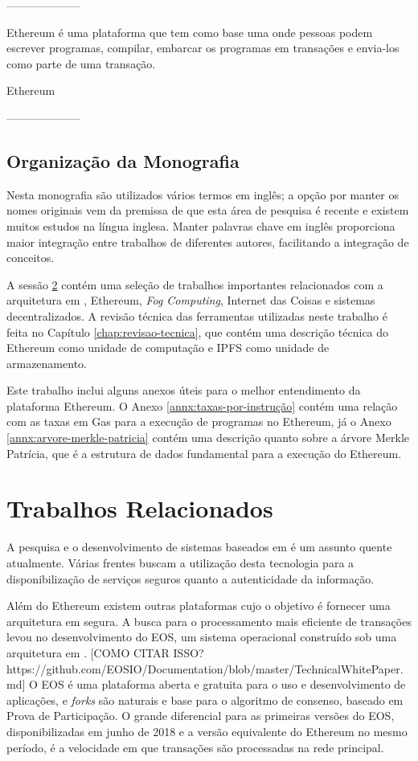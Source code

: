 \documentclass[tcc,capa]{texufpel}
\begin{document}
	--------------------
	
	Ethereum é uma plataforma que tem como base uma \bchain onde pessoas podem escrever programas, compilar, embarcar os  programas em transações e envia-los como parte de uma transação.
	
	Ethereum 
	
	
	--------------------

\section{Organização da Monografia}
    
    Nesta monografia são utilizados vários termos em inglês; a opção por manter os nomes originais vem da premissa de que esta área de pesquisa é recente e existem muitos estudos na língua inglesa. Manter palavras chave em inglês proporciona maior integração entre trabalhos de diferentes autores, facilitando a integração de conceitos.
    
    A sessão \ref{ssc:trabalhos-relacionados} contém uma seleção de trabalhos importantes relacionados com a arquitetura em \bchain, Ethereum, \textit{Fog Computing}, Internet das Coisas e sistemas decentralizados. A revisão técnica das ferramentas utilizadas neste trabalho é feita no Capítulo \ref{chap:revisao-tecnica}, que contém uma descrição técnica do Ethereum como unidade de computação e IPFS como unidade de armazenamento.
    
    Este trabalho inclui alguns anexos úteis para o melhor entendimento da plataforma Ethereum. O Anexo \ref{annx:taxas-por-instrução} contém uma relação com as taxas em Gas para a execução de programas no Ethereum, já o Anexo \ref{annx:arvore-merkle-patricia} contém uma descrição quanto sobre a árvore Merkle Patrícia, que é a estrutura de dados fundamental para a execução do Ethereum.



\chapter{Trabalhos Relacionados}\label{ssc:trabalhos-relacionados}

A pesquisa e o desenvolvimento de sistemas baseados em \bchain é um assunto quente atualmente. Várias frentes buscam a utilização desta tecnologia para a disponibilização de serviços seguros quanto a autenticidade da informação.

Além do Ethereum existem outras plataformas cujo o objetivo é fornecer uma arquitetura em \bchain segura. A busca para o processamento mais eficiente de transações levou no desenvolvimento do EOS, um sistema operacional construído sob uma arquitetura em \bchain. [COMO CITAR ISSO? https://github.com/EOSIO/Documentation/blob/master/TechnicalWhitePaper.md] O EOS é uma plataforma aberta e gratuita para o uso e desenvolvimento de aplicações, e \textit{forks} são naturais e base para o algoritmo de consenso, baseado em Prova de Participação. O grande diferencial para as primeiras versões do EOS, disponibilizadas em junho de 2018 e a versão equivalente do Ethereum no mesmo período, é a velocidade em que transações são processadas na rede principal.
\end{document}
